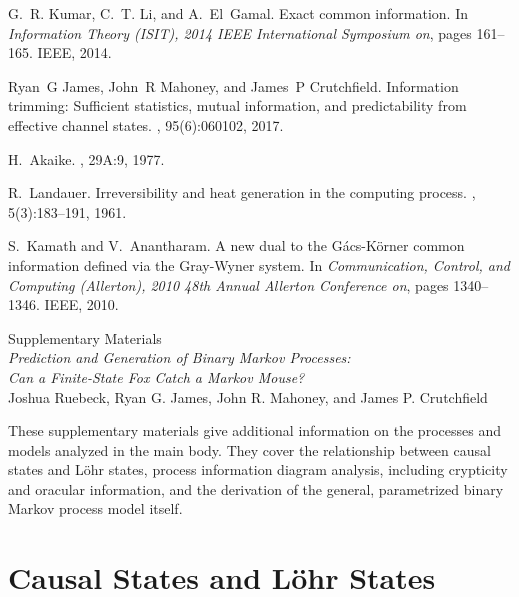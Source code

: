 \documentclass[final,nofootinbib,aps,pre,twocolumn,showpacs,groupaddress,preprintnumbers,floatfix]{revtex4-1}
\begin{document}
\begin{thebibliography}{10}
G.~R. Kumar, C.~T. Li, and A.~El~Gamal.
\newblock Exact common information.
\newblock In {\em Information Theory (ISIT), 2014 IEEE International Symposium
  on}, pages 161--165. IEEE, 2014.

Ryan~G James, John~R Mahoney, and James~P Crutchfield.
\newblock Information trimming: Sufficient statistics, mutual information, and
  predictability from effective channel states.
, 95(6):060102, 2017.

H.~Akaike.
, 29A:9, 1977.

R.~Landauer.
\newblock Irreversibility and heat generation in the computing process.
, 5(3):183--191, 1961.

S.~Kamath and V.~Anantharam.
\newblock A new dual to the {G}{\'a}cs-{K}{\"o}rner common information defined
  via the {G}ray-{W}yner system.
\newblock In {\em Communication, Control, and Computing (Allerton), 2010 48th
  Annual Allerton Conference on}, pages 1340--1346. IEEE, 2010.

\end{thebibliography}

\clearpage
\begin{center}
\large{Supplementary Materials}\\
\emph{Prediction and Generation of Binary Markov Processes:\\
Can a Finite-State Fox Catch a Markov Mouse?}\\
Joshua Ruebeck, Ryan G. James, John R. Mahoney, and James P. Crutchfield
\end{center}

\setcounter{equation}{0}
\setcounter{page}{1}
\setcounter{section}{0}
\makeatletter
\renewcommand{\theequation}{S\arabic{equation}}

These supplementary materials give additional information on the processes and
models analyzed in the main body. They cover the relationship between causal
states and L{\"o}hr states, process information diagram analysis, including
crypticity and oracular information, and the derivation of the general,
parametrized binary Markov process model itself.

\section{Causal States and L{\"o}hr States}
\end{document}
